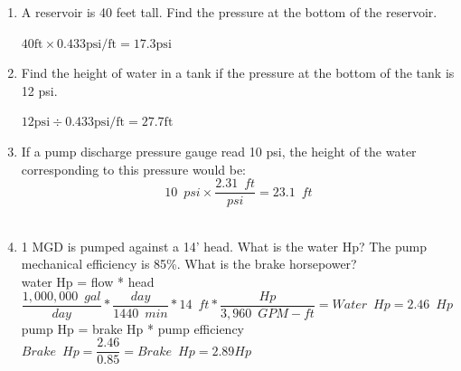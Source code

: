 \documentclass{article}
\begin{document}
\begin{enumerate}

\item A reservoir is 40 feet tall. Find the pressure at the bottom of the reservoir.

$40 \mathrm{ft} \times 0.433 \mathrm{psi} / \mathrm{ft}=17.3 \mathrm{psi}$

\vspace{0.4cm}

\item Find the height of water in a tank if the pressure at the bottom of the tank is 12 psi.

$12 \mathrm{psi} \div 0.433 \mathrm{psi} / \mathrm{ft}=27.7 \mathrm{ft}$

\vspace{0.4cm}

\item If a pump discharge pressure gauge read 10 psi, the height of the water corresponding to this pressure would be:
$$10 \enspace psi \times \dfrac{2.31 \enspace ft}{psi}=23.1 \enspace ft$$\\
\vspace{0.4cm}

\item 1 MGD is pumped against a 14’ head.  What is the water Hp?  The pump mechanical efficiency is 85\%.  What is the brake horsepower?\\
\vspace{0.4cm}
water Hp = flow * head\\
\vspace{0.4cm}
$\dfrac{1,000,000 \enspace gal}{day}*\dfrac{day}{1440 \enspace min}*14 \enspace ft*\dfrac{Hp}{3,960 \enspace GPM-ft}=\boxed{Water \enspace Hp = 2.46 \enspace Hp}$\\
\vspace{0.4cm}
pump Hp = brake Hp * pump efficiency\\
\vspace{0.4cm}
$Brake \enspace Hp = \dfrac{2.46}{0.85}=\boxed{Brake \enspace Hp=2.89Hp}$\\
\vspace{0.4cm}


\end{enumerate}
\end{document}
